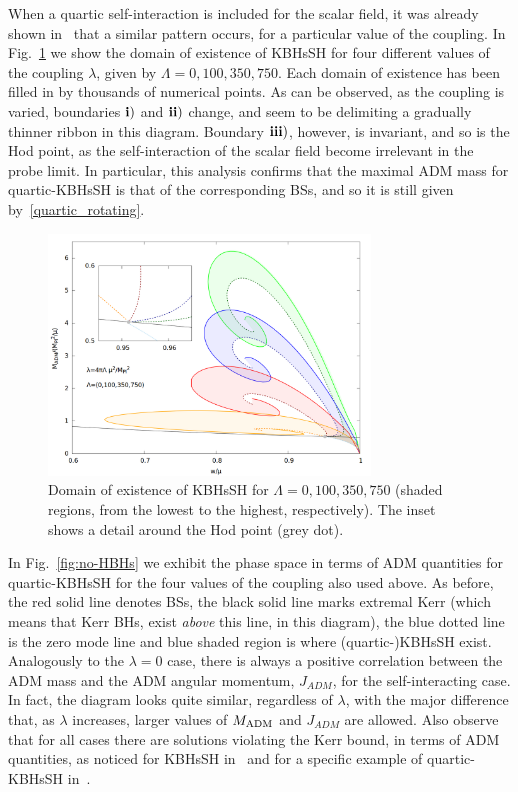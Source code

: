 When a quartic self-interaction is included for the scalar field, it was already shown in~\cite{Kleihaus:2015iea} that a similar pattern occurs, for a particular value of the coupling. In Fig.~\ref{kbhsh1} we show the domain of existence of KBHsSH for four different values of the coupling $\lambda$, given by $\Lambda=0,100,350,750$. Each domain of existence has been filled in by thousands of numerical points. As can be observed, as the coupling is varied, boundaries  ${\bf i)}$ and ${\bf ii)}$ change, and seem to be delimiting a gradually thinner ribbon in this diagram. Boundary  ${\bf iii)}$, however, is invariant, and so is the Hod point, as the self-interaction of the scalar field become irrelevant in the probe limit. In particular, this analysis confirms that the maximal ADM mass for quartic-KBHsSH is that of the corresponding BSs, and so it is still given by~\eqref{quartic_rotating}.




\begin{figure}[h!]
  \begin{center}
    \includegraphics[width=8.55cm]{papers/selfInteractions/BH-w-Mtimes4.png}
      \end{center}
  \caption{Domain of existence of KBHsSH for $\Lambda=0,100,350,750$ (shaded regions, from the lowest to the highest, respectively). The inset shows a detail around the Hod point (grey dot).}
  \label{kbhsh1}
\end{figure}


In Fig.~\ref{fig:no-HBHs} we exhibit the phase space in terms of ADM quantities for quartic-KBHsSH for the four values of the coupling also used above. As before, the red solid line denotes BSs, the black solid line marks extremal Kerr (which means that Kerr BHs, exist \textit{above} this line, in this diagram), the blue dotted line is the zero mode line and blue shaded region is where (quartic-)KBHsSH exist. Analogously to the $\lambda=0$ case, there is always a positive correlation between the ADM mass and the ADM angular momentum, $J_{ADM}$, for the self-interacting case. In fact, the diagram looks quite similar, regardless of $\lambda$, with the major difference that, as $\lambda$ increases, larger values of $M_{\rm ADM}$ and $J_{ADM}$ are allowed. Also observe that for all cases there are solutions violating the Kerr bound, in terms of ADM quantities, as noticed for KBHsSH in~\cite{Herdeiro:2014goa,Herdeiro:2015moa} and for a specific example of quartic-KBHsSH in~\cite{Kleihaus:2015iea}.



